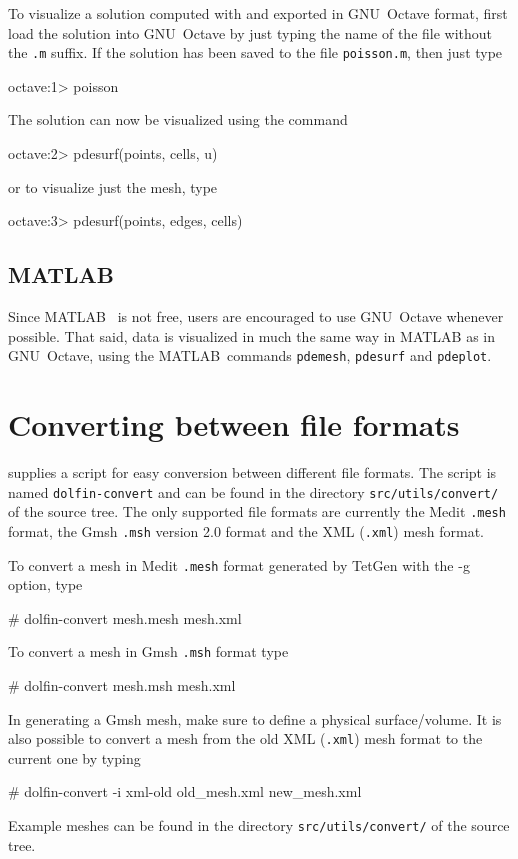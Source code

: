 To visualize a solution computed with \dolfin{} and exported in
GNU~Octave format, first load the solution into GNU~Octave by just
typing the name of the file without the \texttt{.m} suffix. If the
solution has been saved to the file \texttt{poisson.m}, then just type
\begin{code}
octave:1> poisson
\end{code}
The solution can now be visualized using the command
\begin{code}
octave:2> pdesurf(points, cells, u)
\end{code}
or to visualize just the mesh, type
\begin{code}
octave:3> pdesurf(points, edges, cells)
\end{code}

\subsection{MATLAB}

Since MATLAB~\cite{www:MATLAB} is not free, users are encouraged to
use GNU~Octave whenever possible. That said, data is visualized in
much the same way in MATLAB as in GNU~Octave, using the
MATLAB~commands \texttt{pdemesh}, \texttt{pdesurf} and
\texttt{pdeplot}.

\section{Converting between file formats}

\dolfin{} supplies a script for easy conversion between different file
formats.  The script is named \texttt{dolfin-convert} and can be found
in the directory \texttt{src/utils/convert/} of the \dolfin{} source
tree. The only supported file formats are currently the Medit
\texttt{.mesh} format, the Gmsh \texttt{.msh} version 2.0 format and the 
\dolfin{} XML (\texttt{.xml}) mesh format.

To convert a mesh in Medit \texttt{.mesh} format generated by TetGen 
with the -g option, type
\begin{code}
# dolfin-convert mesh.mesh mesh.xml
\end{code}
%
To convert a mesh in Gmsh \texttt{.msh} format type 
\begin{code}
# dolfin-convert mesh.msh mesh.xml
\end{code}
In generating a Gmsh mesh, make sure to define a 
physical surface/volume.
%
It is also possible to convert a mesh from the old \dolfin{} XML
(\texttt{.xml}) mesh format to the current one by typing
\begin{code}
# dolfin-convert -i xml-old old_mesh.xml new_mesh.xml
\end{code}
%
Example meshes can be found in the directory
\texttt{src/utils/convert/} of the \dolfin{} source tree.

